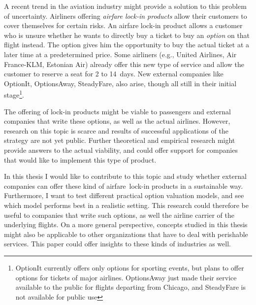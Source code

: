 A recent trend in the aviation industry might provide a solution to this problem of uncertainty. Airliners offering \emph{airfare lock-in products} allow their customers to cover themselves for certain risks. An airfare lock-in product allows a customer who is unsure whether he wants to directly buy a ticket to buy an \emph{option} on that flight instead. The option gives him the opportunity to buy the actual ticket at a later time at a predetermined price. Some airliners (e.g., United Airlines, Air France-KLM, Estonian Air) already offer this new type of service and allow the customer to reserve a seat for 2 to 14~days. New external companies like OptionIt, OptionsAway, SteadyFare, also arise, though all still in their initial stage\footnote{OptionIt currently offers only options for sporting events, but plans to offer options for tickets of major airlines. OptionsAway just made their service available to the public for flights departing from Chicago, and SteadyFare is not available for public use}.

The offering of lock-in products might be viable to passengers and external companies that write these options, as well as the actual airlines. However, research on this topic is scarce and results of successful applications of the strategy are not yet public. Further theoretical and empirical research might provide answers to the actual viability, and could offer support for companies that would like to implement this type of product.

In this thesis I would like to contribute to this topic and study whether external companies can offer these kind of airfare~lock-in products in a sustainable way. Furthermore, I want to test different practical option valuation models, and see which model performs best in a realistic setting. This research could therefore be useful to companies that write such options, as well the airline carrier of the underlying flights. On a more general perspective, concepts studied in this thesis might also be applicable to other organizations that have to deal with perishable services. This paper could offer insights to these kinds of industries as well.